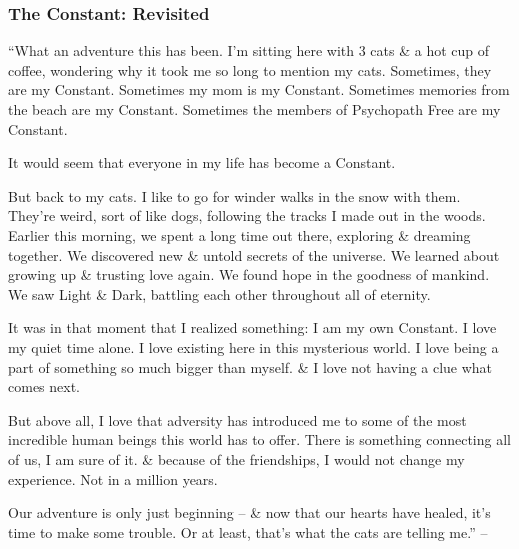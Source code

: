 \documentclass{article}
\numberwithin{equation}{section}
\begin{document}
\subsubsection{The Constant: Revisited}
``What an adventure this has been. I'm sitting here with 3 cats \& a hot cup of coffee, wondering why it took me so long to mention my cats. Sometimes, they are my Constant. Sometimes my mom is my Constant. Sometimes memories from the beach are my Constant. Sometimes the members of Psychopath Free are my Constant.

It would seem that everyone in my life has become a Constant.

But back to my cats. I like to go for winder walks in the snow with them. They're weird, sort of like dogs, following the tracks I made out in the woods. Earlier this morning, we spent a long time out there, exploring \& dreaming together. We discovered new \& untold secrets of the universe. We learned about growing up \& trusting love again. We found hope in the goodness of mankind. We saw Light \& Dark, battling each other throughout all of eternity.

It was in that moment that I realized something: I am my own Constant. I love my quiet time alone. I love existing here in this mysterious world. I love being a part of something so much bigger than myself. \& I love not having a clue what comes next.

But above all, I love that adversity has introduced me to some of the most incredible human beings this world has to offer. There is something connecting all of us, I am sure of it. \& because of the friendships, I would not change my experience. Not in a million years.

Our adventure is only just beginning -- \& now that our hearts have healed, it's time to make some trouble. Or at least, that's what the cats are telling me.'' -- \cite[p. 202]{MacKenzie2015}


\printbibliography[heading=bibintoc]
	
\end{document}
